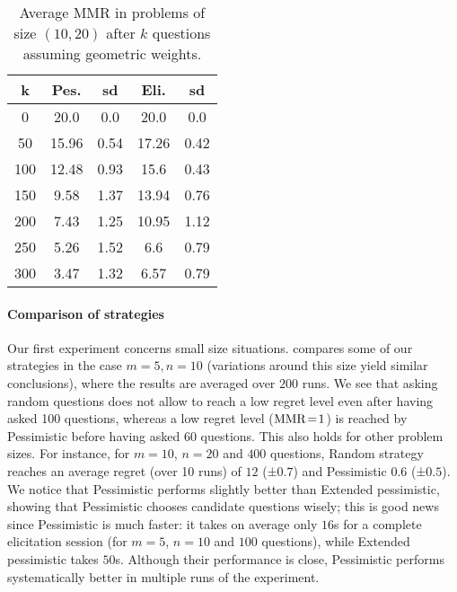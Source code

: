 \documentclass[runningheads]{llncs}
\begin{document}
\begin{table}
	\caption{Average MMR in problems of size $(10, 20)$ after $k$ questions assuming geometric weights.}
	\label{tab:geometricWeights}
	\begin{tabular}{S[table-figures-integer=3, table-figures-decimal=0]S[table-number-alignment = right]@{ ± }S[table-number-alignment = left, table-figures-integer=1]S[table-number-alignment = right]@{ ± }S[table-number-alignment = left, table-figures-integer=1]}
		\toprule
		{k} & {Pes.} & {sd} & {Eli.} & {sd} \\
			&20.0	&0.0	&20.0	&0.0\\
		50	&15.96	&0.54	&17.26	&0.42\\
		100	&12.48	&0.93	&15.6	&0.43\\
		150	&9.58	&1.37	&13.94	&0.76\\
		200	&7.43	&1.25	&10.95	&1.12\\
		250	&5.26	&1.52	&6.6	&0.79\\
		300	&3.47	&1.32	&6.57	&0.79\\
		\bottomrule
	\end{tabular}
\end{table}
\paragraph{Comparison of strategies}
Our first experiment concerns small size situations.
 compares some of our strategies in the case $m = 5, n = 10$ (variations around this size yield similar conclusions), where the results are averaged over $200$ runs.
We see that asking random questions does not allow to reach a low regret level even after having asked 100 questions, whereas a low regret level ($\operatorname{MMR} \!=\! 1$) is reached by Pessimistic before having asked 60 questions. This also holds for other problem sizes. For instance, for $m =10$, $n = 20$ and $400$ questions, Random strategy reaches an average regret (over 10 runs) of $12$ (±$ 0.7$) and Pessimistic $0.6$ (±$ 0.5$).
We notice that Pessimistic performs slightly better than Extended pessimistic, showing that Pessimistic chooses candidate questions wisely; this is good news since Pessimistic is much faster: it takes on average only $16$s for a complete elicitation session (for $m = 5$, $n = 10$ and $100$ questions), while Extended pessimistic takes $50$s. Although their performance is close, Pessimistic performs systematically better in multiple runs of the experiment.
\end{document}
